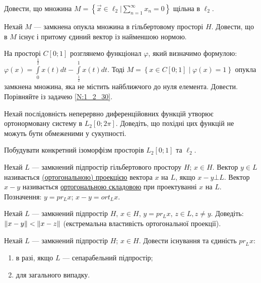 
\begin{exercise}
    Довести, що множина $M = \left\{ \vec{x} \in \ell_2 | \sum\limits_{n = 1}^{\infty}x_n = 0\right\}$
    щільна в $\ell_2$.
\end{exercise}

\begin{exercise}\label{N:1_2_30}
    Нехай $M$ --- замкнена опукла множина в гільбертовому просторі $H$. Довести, що в $M$
    існує і притому єдиний вектор із найменшою нормою.
\end{exercise}

\begin{exercise}
    На просторі $C[0;1]$ розглянемо функціонал $\varphi$, який визначимо формулою: 
    $\varphi(x) = \int\limits_{0}^{\frac{1}{2}}x(t)dt - \int\limits_{\frac{1}{2}}^{1}x(t)dt$. Тоді
    $M = \left\{x \in C[0; 1] \mid \varphi(x) = 1\right\}$ опукла замкнена множина, яка не містить найближчого до 
    нуля елемента. Довести. Порівняйте із задачею \ref{N:1_2_30}.
\end{exercise}

\begin{exercise}\label{N:1_2_32}
    Нехай послідовність неперервно диференційовних функцій утворює ортонормовану систему
    в $L_2[0; 2\pi]$. Доведіть, що похідні цих функцій не можуть бути обмеженими у сукупності.
\end{exercise}

\begin{exercise}
    Побудувати конкретний ізоморфізм просторів $L_2[0;1]$ та $\ell_2$.
\end{exercise}

\begin{theory}
    Нехай $L$ --- замкнений підпростір гільбертового простору $H$; $x \in H$. Вектор
    $y \in L$ називається \uline{(ортогональною) проекцією} вектора $x$ на $L$, якщо
    $x - y \bot L$. Вектор $x - y$ називається \uline{ортогональною складовою} при
    проектуванні $x$ на $L$. Позначення: $y = pr_L x$; $x - y = ort_L x$.
\end{theory}

\begin{exercise}
    Нехай $L$ --- замкнений підпростір $H$, $x \in H$, $y = pr_L x$, $z \in L, z \neq y$.
    Доведіть: $\left\lVert x - y\right\rVert < \left\lVert x - z\right\rVert$ (екстремальна властивість ортогональної проекції).
\end{exercise}

\begin{exercise}
    Нехай $L$ --- замкнений підпростір $H$; $x \in H$. Довести існування та єдиність ${pr}_L x$:
    \begin{enumerate}[label=\ukr*)]
        \item в разі, якщо $L$ --- сепарабельний підпростір;
        \item для загального випадку.
    \end{enumerate}
\end{exercise}

